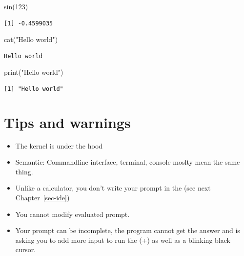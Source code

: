 \documentclass[
  letterpaper,
  DIV=11,
  numbers=noendperiod]{scrreprt}
\newenvironment{Shaded}{\begin{snugshade}}{\end{snugshade}}
\newcommand{\DecValTok}[1]{\textcolor[rgb]{0.68,0.00,0.00}{#1}}
\newcommand{\FunctionTok}[1]{\textcolor[rgb]{0.28,0.35,0.67}{#1}}
\newcommand{\NormalTok}[1]{\textcolor[rgb]{0.00,0.23,0.31}{#1}}
\newcommand{\StringTok}[1]{\textcolor[rgb]{0.13,0.47,0.30}{#1}}
\providecommand{\tightlist}{%
  \setlength{\itemsep}{0pt}\setlength{\parskip}{0pt}}
\begin{document}
\begin{Shaded}
\begin{Highlighting}[]
\FunctionTok{sin}\NormalTok{(}\DecValTok{123}\NormalTok{)}
\end{Highlighting}
\end{Shaded}

\begin{verbatim}
[1] -0.4599035
\end{verbatim}

\begin{Shaded}
\begin{Highlighting}[]
\FunctionTok{cat}\NormalTok{(}\StringTok{"Hello world"}\NormalTok{)}
\end{Highlighting}
\end{Shaded}

\begin{verbatim}
Hello world
\end{verbatim}

\begin{Shaded}
\begin{Highlighting}[]
\FunctionTok{print}\NormalTok{(}\StringTok{"Hello world"}\NormalTok{)}
\end{Highlighting}
\end{Shaded}

\begin{verbatim}
[1] "Hello world"
\end{verbatim}

\section*{Tips and warnings}\label{tips-and-warnings-18}


\begin{itemize}
\tightlist
\item
  The kernel is under the hood
\item
  Semantic: Commandline interface, terminal, console moslty mean the
  same thing.
\item
  Unlike a calculator, you don't write your prompt in the (see next
  Chapter~\ref{sec-ide})
\item
  You cannot modify evaluated prompt.
\item
  Your prompt can be incomplete, the program cannot get the answer and
  is asking you to add more input to run the (+) as well as a blinking
  black cursor.
\end{itemize}
\end{document}
